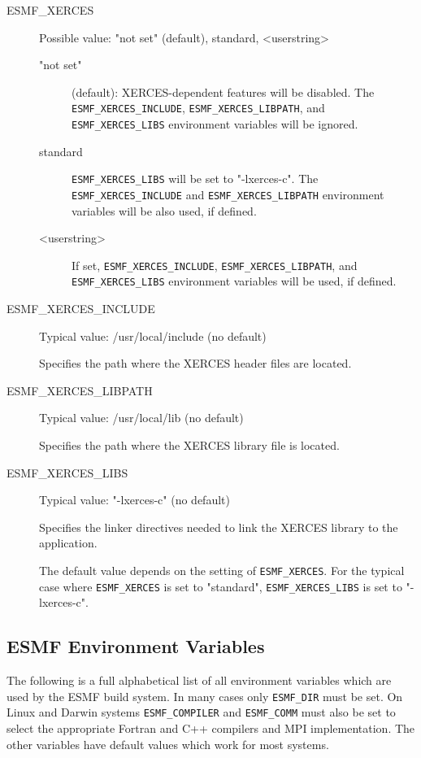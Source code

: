 \begin{description}

\item[ESMF\_XERCES] Possible value: "not set" (default), standard, <userstring>

\begin{description}
\item["not set"] (default): XERCES-dependent features will be disabled.
The {\tt ESMF\_XERCES\_INCLUDE}, {\tt ESMF\_XERCES\_LIBPATH}, and
{\tt ESMF\_XERCES\_LIBS} environment variables will be ignored.

\item[standard] {\tt ESMF\_XERCES\_LIBS} will be set to "-lxerces-c".  
The {\tt ESMF\_XERCES\_INCLUDE} and {\tt ESMF\_XERCES\_LIBPATH}
environment variables will be also used, if defined.

\item[<userstring>] If set, {\tt ESMF\_XERCES\_INCLUDE}, {\tt ESMF\_XERCES\_LIBPATH},
and {\tt ESMF\_XERCES\_LIBS} environment variables will be used, if defined.
\end{description}

\item[ESMF\_XERCES\_INCLUDE] Typical value: /usr/local/include (no default)

Specifies the path where the XERCES header files are located.

\item[ESMF\_XERCES\_LIBPATH] Typical value: /usr/local/lib (no default)

Specifies the path where the XERCES library file is located.

\item[ESMF\_XERCES\_LIBS] Typical value: "-lxerces-c" (no default)

Specifies the linker directives needed to link the XERCES library to
the application.

The default value depends on the setting of {\tt ESMF\_XERCES}.  For the
typical case where {\tt ESMF\_XERCES} is set to "standard", {\tt ESMF\_XERCES\_LIBS} is set to "-lxerces-c". 
\end{description}

\subsection{ESMF Environment Variables}
\label{EnvironmentVariables}

The following is a full alphabetical list of all environment variables which
are used by the ESMF build system. In many cases only {\tt ESMF\_DIR} must be 
set. On Linux and Darwin systems {\tt ESMF\_COMPILER} and {\tt ESMF\_COMM} must
also be set to select the appropriate Fortran and C++ compilers and MPI 
implementation. The other variables have default values which work for
most systems.

